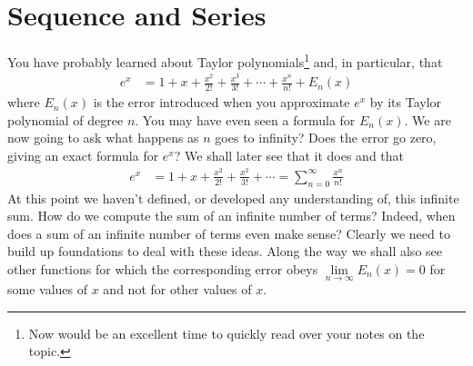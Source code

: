 %
%
\graphicspath{{figures/series/}}
\chapter{Sequence and Series}\label{chap seq ser}

You have probably learned about Taylor polynomials\footnote{Now would be an
excellent time to quickly read over your notes on the topic.} and, in particular, that
\begin{align*}
e^x &= 1 + x  + \frac{x^2}{2!} + \frac{x^3}{3!} + \cdots + \frac{x^n}{n!}
      +E_n(x)
\end{align*}
where $E_n(x)$ is the error introduced when you approximate $e^x$ by
its Taylor polynomial of degree $n$. You may have even seen a formula for $E_n(x)$. We are now going to ask what happens as $n$
goes to infinity? Does the error go zero, giving an exact formula for $e^x$? We shall later see that it does and
that
\begin{align*}
e^x &=1 + x  + \frac{x^2}{2!} + \frac{x^3}{3!} + \cdots = \sum_{n=0}^\infty\frac{x^n}{n!}
\end{align*}
At this point we haven't defined, or developed any understanding of,
this infinite sum. How do we compute the sum of an infinite number of
terms? Indeed, when does a sum of an infinite
number of terms even make sense? Clearly we need to build up
foundations to deal with these ideas. Along the way we
shall also see other functions for which the corresponding error
obeys $\lim\limits_{n\rightarrow\infty}E_n(x)=0$ for
some values of $x$ and not for other values of $x$.

